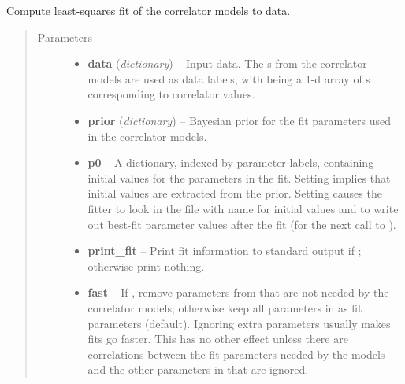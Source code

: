 \documentclass[letterpaper,10pt,english]{sphinxmanual}
\begin{document}
\begin{fulllineitems}
\begin{fulllineitems}
\label{corrfitter:corrfitter.CorrFitter.lsqfit}
Compute least-squares fit of the correlator models to data.
\begin{quote}\begin{description}
\item[{Parameters}] \leavevmode\begin{itemize}
\item {} 
\textbf{data} (\emph{dictionary}) -- Input data. The s from the 
correlator models are used as data labels, with 
 being a 1-d array of s 
corresponding to correlator values.

\item {} 
\textbf{prior} (\emph{dictionary}) -- Bayesian prior for the fit parameters used in the 
correlator models.

\item {} 
\textbf{p0} -- A dictionary, indexed by parameter labels, containing 
initial values for the parameters in the fit. Setting
 implies that initial values are extracted from the
prior. Setting  causes the fitter to look in
the file with name  for initial values and to
write out best-fit parameter values after the fit (for the next
call to ).

\item {} 
\textbf{print\_fit} -- Print fit information to standard output if 
; otherwise print nothing.

\item {} 
\textbf{fast} -- If , remove parameters from  that are 
not needed by the correlator models; otherwise keep all 
parameters in  as fit parameters (default). 
Ignoring extra parameters usually makes fits go faster.
This has no other effect unless there are correlations between the 
fit parameters needed by the models and the other parameters in 
 that are ignored.

\end{itemize}

\end{description}\end{quote}


\end{fulllineitems}
\end{fulllineitems}
\end{document}

